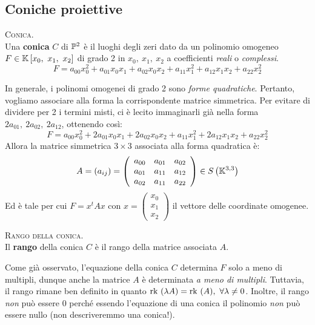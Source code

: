 \subsection{Coniche proiettive}
\begin{define}\textsc{Conica}.\\
		Una \textbf{conica} $C$ di $\proj[2]{\ }$ è il luoghi degli zeri dato da un polinomio omogeneo $F\in\mathbb{K}\left[x_0,\ x_1,\ x_2\right]$ di grado 2 in $x_0,\ x_1,\ x_2$ a coefficienti \textit{reali} o \textit{complessi}.
		\begin{equation*}
			F=a_{00}x_0^2 +a_{01}x_0x_1+a_{02}x_0x_2+a_{11}x_1^2+a_{12}x_1x_2+a_{22}x_2^2
		\end{equation*}
\end{define}
In generale, i polinomi omogenei di grado 2 sono \textit{forme quadratiche}. Pertanto, vogliamo associare alla forma la  corrispondente matrice simmetrica.
Per evitare di dividere per 2 i termini misti, ci è lecito immaginarli già nella forma $2a_{01},\ 2a_{02},\ 2a_{12}$, ottenendo così:
\begin{equation*}
F=a_{00}x_0^2 +2a_{01}x_0x_1+2a_{02}x_0x_2+a_{11}x_1^2+2a_{12}x_1x_2+a_{22}x_2^2
\end{equation*}
Allora la matrice simmetrica $3\times 3$ associata alla forma quadratica è:
\begin{equation}
	A=(a_{ij})=\left(\begin{array}{ccc}
		a_{00} & a_{01} & a_{02}\\
		a_{01} & a_{11} & a_{12}\\
		a_{02} & a_{11} & a_{22}\\
	\end{array}\right)\in S\left(\mathbb{K}^{3,3}\right)
\end{equation}
Ed è tale per cui $\displaystyle F=x^tAx$ con $x=\left( \begin{array}{c}
x_0 \\ x_1 \\ x_2
\end{array} \right)$ il vettore delle coordinate omogenee.\\
\begin{define}\textsc{Rango della conica}.\\
Il \textbf{rango} della conica $C$ è il rango della matrice associata $A$.
\end{define}
\begin{observe}
Come già osservato, l'equazione della conica $C$ determina $F$ solo a meno di multipli, dunque anche la matrice $A$ è determinata \textit{a meno di multipli}. 
Tuttavia, il rango rimane ben definito in quanto $\rk(\lambda A)=\rk(A),\ \forall\lambda\neq 0$. Inoltre, il rango \textit{non} può essere $0$ perché essendo l'equazione di una conica il polinomio \textit{non} può essere nullo (non descriveremmo una conica!).
\end{observe}
